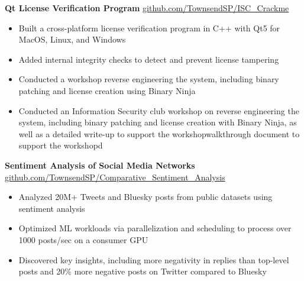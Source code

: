 \textbf{Qt License Verification Program} \hfill \href{https://github.com/TownsendSP/ISC_Crackme}{github.com/TownsendSP/ISC\_Crackme} \\
\vspace{-9pt}
\begin{itemize}
	\item Built a cross-platform license verification program in C++ with Qt5 for MacOS, Linux, and Windows
	\item Added internal integrity checks to detect and prevent license tampering
	\item Conducted a workshop reverse engineering the system, including binary patching and license creation using Binary Ninja
	\item Conducted an Information Security club workshop on reverse engineering the system, including binary patching and license creation with Binary Ninja, as well as a detailed write-up to support the workshopwalkthrough document to support the workshopd
\end{itemize}

\vspace{-7pt}

\textbf{Sentiment Analysis of Social Media Networks} \hfill \href{https://github.com/TownsendSP/Comparative_Sentiment_Analysis}{github.com/TownsendSP/Comparative\_Sentiment\_Analysis} \\
\vspace{-9pt}
\begin{itemize}
	\item Analyzed 20M+ Tweets and Bluesky posts from public datasets using sentiment analysis
	\item Optimized ML workloads via parallelization and scheduling to process over 1000 posts/sec on a consumer GPU
	\item Discovered key insights, including more negativity in replies than top-level posts and 20\% more negative posts on Twitter compared to Bluesky
\end{itemize}

\vspace{-25pt}


